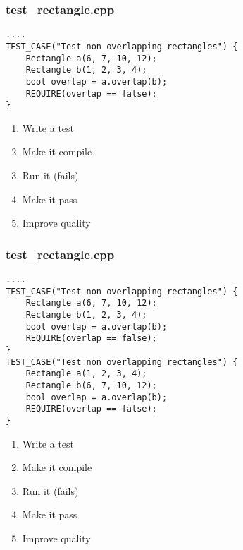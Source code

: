 \begin{frame}[fragile]
\frametitle{test\_rectangle.cpp}
\begin{minipage}[t]{0.48\linewidth}
\begin{lstlisting}
....
TEST_CASE("Test non overlapping rectangles") {
    Rectangle a(6, 7, 10, 12);
    Rectangle b(1, 2, 3, 4);
    bool overlap = a.overlap(b);
    REQUIRE(overlap == false);
}
\end{lstlisting}
\end{minipage}\hfill
\begin{minipage}[t]{0.28\linewidth}
  \small
  \begin{enumerate} 
    \item \textcolor{activecolor}{Write a test}
    \item \textcolor{deadcolor}{Make it compile}
    \item \textcolor{deadcolor}{Run it (fails)}
    \item \textcolor{deadcolor}{Make it pass}
    \item \textcolor{deadcolor}{Improve quality}
  \end{enumerate} 
\end{minipage}
\end{frame}


\begin{frame}[fragile]
\frametitle{test\_rectangle.cpp}
\begin{minipage}[t]{0.48\linewidth}
\begin{lstlisting}
....
TEST_CASE("Test non overlapping rectangles") {
    Rectangle a(6, 7, 10, 12);
    Rectangle b(1, 2, 3, 4);
    bool overlap = a.overlap(b);
    REQUIRE(overlap == false);
}
TEST_CASE("Test non overlapping rectangles") {
    Rectangle a(1, 2, 3, 4);
    Rectangle b(6, 7, 10, 12);
    bool overlap = a.overlap(b);
    REQUIRE(overlap == false);
}
\end{lstlisting}
\end{minipage}\hfill
\begin{minipage}[t]{0.28\linewidth}
  \small
  \begin{enumerate} 
    \item \textcolor{activecolor}{Write a test}
    \item \textcolor{deadcolor}{Make it compile}
    \item \textcolor{deadcolor}{Run it (fails)}
    \item \textcolor{deadcolor}{Make it pass}
    \item \textcolor{deadcolor}{Improve quality}
  \end{enumerate} 
\end{minipage}
\end{frame}


